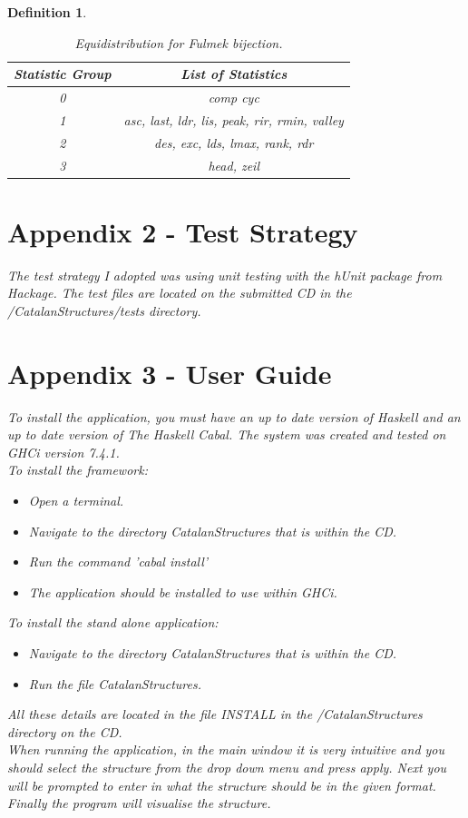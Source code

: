 \documentclass[12pt]{article}
\newtheorem{definition}{Definition}
\begin{document}
\begin{definition}
\begin{table}[H]
\caption{Equidistribution for Fulmek bijection.}
\centering
\begin{tabular}{c | c}
\hline\hline
Statistic Group & List of Statistics \\ [0.5ex]
\hline
0 & {comp cyc} \\
1 & {asc, last, ldr, lis, peak, rir, rmin, valley} \\
2 & {des, exc, lds, lmax, rank, rdr} \\
3 & {head, zeil} 
\hline
\end{tabular}
\label{table:EDFulmekPerms}
\end{table}
\newpage

\section{Appendix 2 - Test Strategy}
The test strategy I adopted was using unit testing with the hUnit package from Hackage. The test files are located on the submitted CD in the /CatalanStructures/tests directory.

\section{Appendix 3 - User Guide}
To install the application, you must have an up to date version of Haskell and an up to date version of {\it The Haskell Cabal}. The system was created and tested on GHCi version 7.4.1.\\
To install the framework:
\begin{itemize}
\item Open a terminal.
\item Navigate to the directory CatalanStructures that is within the CD. 
\item Run the command 'cabal install'
\item The application should be installed to use within GHCi.
\end{itemize}
To install the stand alone application:
\begin{itemize}
\item Navigate to the directory CatalanStructures that is within the CD. 
\item Run the file CatalanStructures.
\end{itemize}
All these details are located in the file INSTALL in the /CatalanStructures directory on the CD.\\
When running the application, in the main window it is very intuitive and you should select the structure from the drop down menu and press apply. Next you will be prompted to enter in what the structure should be in the given format. Finally the program will visualise the structure.


\end{definition}
\end{document}
